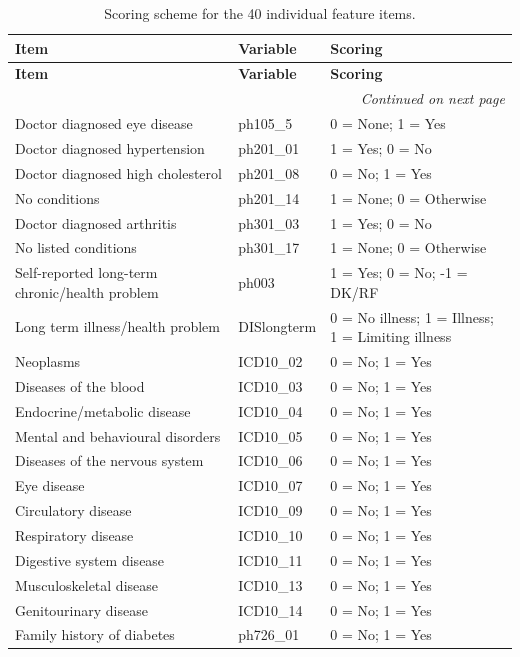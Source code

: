 \begin{longtable}{p{7cm} p{3cm} p{4cm}}
\caption{Scoring scheme for the 40 individual feature items.} \\
\toprule
\textbf{Item} & \textbf{Variable} & \textbf{Scoring} \\
\midrule
\endfirsthead
\toprule
\textbf{Item} & \textbf{Variable} & \textbf{Scoring} \\
\midrule
\endhead
\midrule
\multicolumn{3}{r}{\emph{Continued on next page}} \\
\midrule
\endfoot
\bottomrule
\endlastfoot

Doctor diagnosed eye disease & ph105\_5 & 0 = None; 1 = Yes \\
Doctor diagnosed hypertension & ph201\_01 & 1 = Yes; 0 = No \\
Doctor diagnosed high cholesterol & ph201\_08 & 0 = No; 1 = Yes \\
No conditions & ph201\_14 & 1 = None; 0 = Otherwise \\
Doctor diagnosed arthritis & ph301\_03 & 1 = Yes; 0 = No \\
No listed conditions & ph301\_17 & 1 = None; 0 = Otherwise \\
Self-reported long-term chronic/health problem & ph003 & 1 = Yes; 0 = No; -1 = DK/RF \\
Long term illness/health problem & DISlongterm & 0 = No illness; 1 = Illness; 1 = Limiting illness \\
Neoplasms & ICD10\_02 & 0 = No; 1 = Yes \\
Diseases of the blood & ICD10\_03 & 0 = No; 1 = Yes \\
Endocrine/metabolic disease & ICD10\_04 & 0 = No; 1 = Yes \\
Mental and behavioural disorders & ICD10\_05 & 0 = No; 1 = Yes \\
Diseases of the nervous system & ICD10\_06 & 0 = No; 1 = Yes \\
Eye disease & ICD10\_07 & 0 = No; 1 = Yes \\
Circulatory disease & ICD10\_09 & 0 = No; 1 = Yes \\
Respiratory disease & ICD10\_10 & 0 = No; 1 = Yes \\
Digestive system disease & ICD10\_11 & 0 = No; 1 = Yes \\
Musculoskeletal disease & ICD10\_13 & 0 = No; 1 = Yes \\
Genitourinary disease & ICD10\_14 & 0 = No; 1 = Yes \\
Family history of diabetes & ph726\_01 & 0 = No; 1 = Yes \\

\end{longtable}
